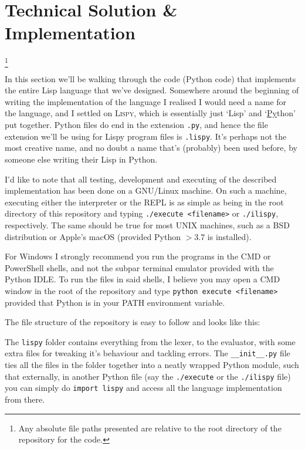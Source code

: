 \documentclass{article}
\newcommand{\code}[1]{\texttt{#1}}
\newcommand\blfootnote[1]{%
  \begingroup
  \renewcommand\thefootnote{}\footnote{#1}%
  \addtocounter{footnote}{-1}%
  \endgroup
}
\begin{document}
    \clearpage


\section{Technical Solution \& Implementation}
  \blfootnote{Any absolute file paths presented are relative to the root directory of
  the repository for the code.}
  In this section we'll be walking through the code (Python code) that
  implements the entire Lisp language that we've designed. Somewhere around
  the beginning of writing the implementation of the language I realised I would
  need a name for the language, and I settled on \textsc{Lispy}, which is
  essentially just `Lisp' and `\underline{Py}thon' put together. Python files
  do end in the extension \code{.py}, and hence the file extension we'll
  be using for Lispy program files is \code{.lispy}.  It's perhaps not the most
  creative name, and no doubt a name that's (probably) been used before, by someone else
  writing their Lisp in Python.

  I'd like to note that all testing, development and executing of the described
  implementation has been done on a GNU/Linux machine. On such a machine, executing
  either the interpreter or the REPL is as simple as being in the root directory
  of this repository and typing \code{./execute <filename>} or \code{./ilispy},
  respectively.  The same should be true for most UNIX machines, such as a
  BSD distribution or Apple's macOS (provided Python $>$3.7 is installed).

  For Windows I strongly recommend you run the programs in the CMD or PowerShell
  shells, and not the subpar terminal emulator provided with the Python IDLE.
  To run the files in said shells, I believe you may open a CMD window in the
  root of the repository and type \code{python execute <filename>} provided that
  Python is in your PATH environment variable.

  \clearpage

  The file structure of the repository is easy to follow and looks like this:

  \clearpage

  The \code{lispy} folder contains everything from the lexer, to the evaluator,
  with some extra files for tweaking it's behaviour and tackling errors.
  The \code{\_\_init\_\_.py} file ties all the files in the folder together into a
  neatly wrapped Python module, such that externally, in another Python file
  (say the \code{./execute} or the \code{./ilispy} file) you can simply do
  \code{import lispy} and access all the language implementation from there.
\end{document}
